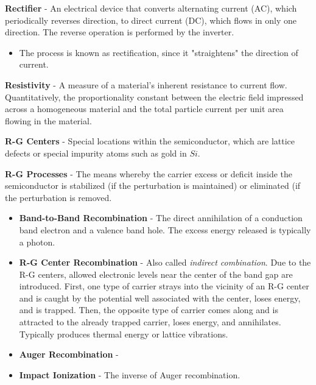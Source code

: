 \vspace{0.5cm}
\noindent
    \textbf{Rectifier} - An electrical device that converts alternating current (AC), which periodically reverses direction, to direct current (DC), which flows in only one direction. The reverse operation is performed by the inverter.
    \vspace{0.15cm}
    \begin{itemize}
        \setlength\itemsep{0.5em}
        \item{The process is known as rectification, since it "straightens" the direction of current.}
    \end{itemize}
\vspace{0.5cm}
    \textbf{Resistivity} - A measure of a material's inherent resistance to current flow.  Quantitatively, the proportionality constant between the electric field impressed across a homogeneous material and the total particle current per unit area flowing in the material.

\vspace{0.5cm}
\noindent
    \textbf{R-G Centers} - Special locations within the semiconductor, which are lattice defects or special impurity atoms such as gold in $Si$.

\vspace{0.5cm}
\noindent
    \textbf{R-G Processes} - The means whereby the carrier excess or deficit inside the semiconductor is stabilized (if the perturbation is maintained) or eliminated (if the perturbation is removed.
    \vspace{0.15cm}
    \begin{itemize}
        \setlength\itemsep{0.5em}
        \item{\textbf{Band-to-Band Recombination} - The direct annihilation of a conduction band electron and a valence band hole.  The excess energy released is typically a photon.}
        \item{\textbf{R-G Center Recombination} - Also called \emph{indirect combination}.  Due to the R-G centers, allowed electronic levels near the center of the band gap are introduced.  First, one type of carrier strays into the vicinity of an R-G center and is caught by the potential well associated with the center, loses energy, and is trapped.  Then, the opposite type of carrier comes along and is attracted to the already trapped carrier, loses energy, and annihilates.  Typically produces thermal energy or lattice vibrations.}
        \item{\textbf{Auger Recombination} - }
        \item{\textbf{Impact Ionization} - The inverse of Auger recombination.}
    \end{itemize}

